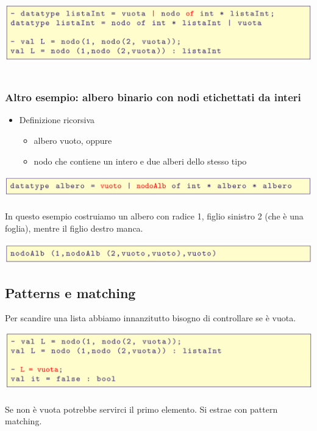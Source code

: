 \documentclass[10pt]{article}
\begin{document}
\includegraphics[scale=0.2]{Immagini/ml15.png}
\\\\
\subsubsection{Altro esempio: albero binario con nodi etichettati da interi}
\begin{itemize}
    \item Definizione ricorsiva
    \begin{itemize}
        \item albero vuoto, oppure
        \item nodo che contiene un intero e due alberi dello stesso tipo
    \end{itemize}
\end{itemize}
\includegraphics[scale=0.2]{Immagini/ml16.png}
\\\\
In questo esempio costruiamo un albero con radice 1, figlio
sinistro 2 (che è una foglia), mentre il figlio destro manca.

\includegraphics[scale=0.2]{Immagini/ml17.png}
\subsection{Patterns e matching}
Per scandire una lista abbiamo innanzitutto bisogno di controllare
se è vuota.

\includegraphics[scale=0.2]{Immagini/ml18.png}
\\\\
Se non è vuota potrebbe servirci il primo elemento. Si estrae con
pattern matching.
\end{document}
